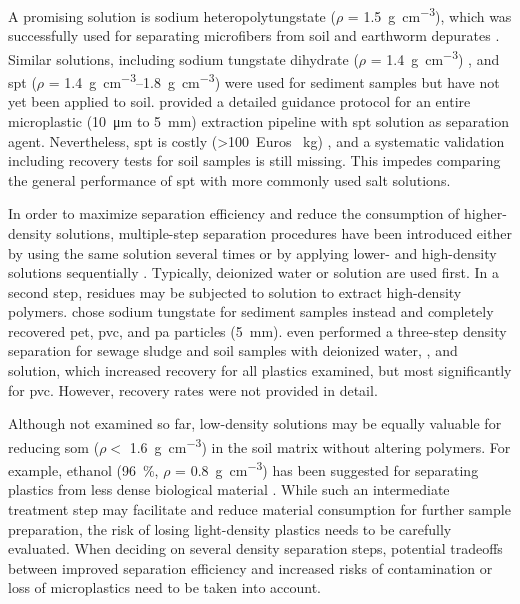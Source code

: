 A promising solution is sodium heteropolytungstate ($\rho$ = \SI{1.5}{\gram\per\cubic\centi\meter}), which was successfully used for separating microfibers from soil and earthworm depurates \citep{Prendergast-MillerPolyesterderived2019}. Similar solutions, including sodium tungstate dihydrate ($\rho$ = \SI{1.4}{\gram\per\cubic\centi\meter}) \citep{FriasStandardised2018}, and \ac{spt} ($\rho$ = \SIrange{1.4}{1.8}{\gram\per\cubic\centi\meter}) \citep{BallentSources2016,EndersTracing2019,EndersWhen2020,CorcoranPlastics2009} were used for sediment samples but have not yet been applied to soil.
 provided a detailed guidance protocol for an entire microplastic (\SI{10}{\micro\meter} to \SI{5}{\milli\meter}) extraction pipeline with \ac{spt} solution as separation agent. Nevertheless, \ac{spt} is costly (\num{>100}~Euros \si{\per\kilo\gram}) \citep{CampanalePractical2020}, and a systematic validation including recovery tests for soil samples is still missing. This impedes comparing the general performance of \ac{spt} with more commonly used salt solutions.

In order to maximize separation efficiency and reduce the consumption of higher-density solutions, multiple-step separation procedures have been introduced either by using the same solution several times \citep{LiuMicroplastic2018,HuangAgricultural2020} or by applying lower- and high-density solutions sequentially \citep{NuelleNew2014,HurleyValidation2018,CorradiniEvidence2019,vandenBergSewage2020,DekiffOccurrence2014,ZhouDistribution2018}. Typically, deionized water \citep{vandenBergSewage2020,HurleyValidation2018} or  solution \citep{NuelleNew2014,DekiffOccurrence2014,ZhouDistribution2018,FrereInfluence2017} are used first.
In a second step, residues may be subjected to  solution to extract high-density polymers.  chose sodium tungstate for sediment samples instead and completely recovered \ac{pet}, \ac{pvc}, and \ac{pa} particles (\SI{5}{\milli\meter}).  even performed a three-step density separation for sewage sludge and soil samples with deionized water, , and  solution, which increased recovery for all plastics examined, but most significantly for \ac{pvc}. However, recovery rates were not provided in detail.

Although not examined so far, low-density solutions may be equally valuable for reducing \ac{som} ($\rho <$ \SI{1.6}{\gram\per\cubic\centi\meter}) \citep{CerliSeparation2012} in the soil matrix without altering polymers. For example, ethanol (\SI{96}{\percent}, $\rho$ = \SI{0.8}{\gram\per\cubic\centi\meter}) has been suggested for separating plastics from less dense biological material \citep{HerreraNovel2018}. While such an intermediate treatment step may facilitate and reduce material consumption for further sample preparation, the risk of losing light-density plastics needs to be carefully evaluated. When deciding on several density separation steps, potential tradeoffs between improved separation efficiency and increased risks of contamination or loss of microplastics need to be taken into account.

